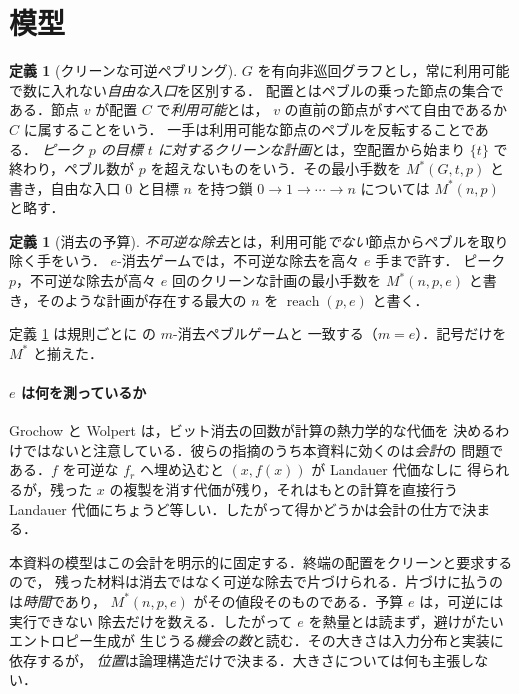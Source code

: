 \documentclass[a4paper,11pt]{jsarticle}
\theoremstyle{definition}
\newtheorem{definition}[theorem]{定義}
\newcommand{\Mstar}{M^{*}}
\newcommand{\reach}{\operatorname{reach}}
\begin{document}
\section{模型}
\begin{definition}[クリーンな可逆ペブリング]\label{def:game}
$G$ を有向非巡回グラフとし，常に利用可能で数に入れない\emph{自由な入口}を区別する．
配置とはペブルの乗った節点の集合である．節点 $v$ が配置 $C$ で\emph{利用可能}とは，
$v$ の直前の節点がすべて自由であるか $C$ に属することをいう．
一手は利用可能な節点のペブルを反転することである．
\emph{ピーク $p$ の目標 $t$ に対するクリーンな計画}とは，空配置から始まり
$\{t\}$ で終わり，ペブル数が $p$ を超えないものをいう．その最小手数を
$\Mstar(G,t,p)$ と書き，自由な入口 $0$ と目標 $n$ を持つ鎖
$0 \to 1 \to \cdots \to n$ については $\Mstar(n,p)$ と略す．
\end{definition}

\begin{definition}[消去の予算]\label{def:erasure}
\emph{不可逆な除去}とは，利用可能\emph{でない}節点からペブルを取り除く手をいう．
$e$-消去ゲームでは，不可逆な除去を高々 $e$ 手まで許す．
ピーク $p$，不可逆な除去が高々 $e$ 回のクリーンな計画の最小手数を
$\Mstar(n,p,e)$ と書き，そのような計画が存在する最大の $n$ を $\reach(p,e)$ と書く．
\end{definition}

定義 \ref{def:erasure} は規則ごとに \cite{LiTV98} の $m$-消去ペブルゲームと
一致する（$m = e$）．記号だけを $\Mstar$ と揃えた．

\paragraph{$e$ は何を測っているか}
Grochow と Wolpert \cite{GW2018} は，ビット消去の回数が計算の熱力学的な代価を
決めるわけではないと注意している．彼らの指摘のうち本資料に効くのは\emph{会計}の
問題である．$f$ を可逆な $f_r$ へ埋め込むと $(x,f(x))$ が Landauer 代価なしに
得られるが，残った $x$ の複製を消す代価が残り，それはもとの計算を直接行う
Landauer 代価にちょうど等しい．したがって得かどうかは会計の仕方で決まる．

本資料の模型はこの会計を明示的に固定する．終端の配置をクリーンと要求するので，
残った材料は消去ではなく可逆な除去で片づけられる．片づけに払うのは\emph{時間}であり，
$\Mstar(n,p,e)$ がその値段そのものである．予算 $e$ は，可逆には実行できない
除去だけを数える．したがって $e$ を熱量とは読まず，避けがたいエントロピー生成が
生じうる\emph{機会の数}と読む．その大きさは入力分布と実装に依存するが，
\emph{位置}は論理構造だけで決まる．大きさについては何も主張しない．
\end{document}

